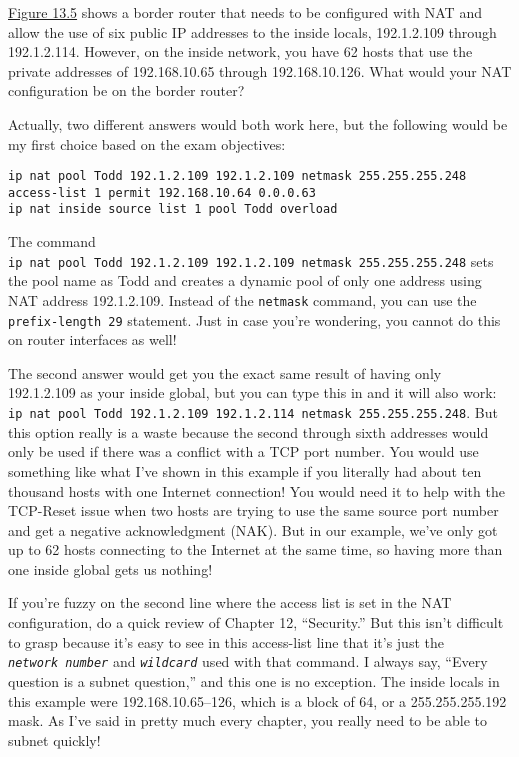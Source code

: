 \protect\hyperlink{c13.xhtmlux5cux23figure13-5}{Figure
13.5} shows a border router that needs to be configured with NAT and
allow the use of six public IP addresses to the inside locals,
192.1.2.109 through 192.1.2.114. However, on the inside network, you
have 62 hosts that use the private addresses of 192.168.10.65 through
192.168.10.126. What would your NAT configuration be on the border
router?

Actually, two different answers would both work here, but the following
would be my first choice based on the exam objectives:

\begin{verbatim}
ip nat pool Todd 192.1.2.109 192.1.2.109 netmask 255.255.255.248
access-list 1 permit 192.168.10.64 0.0.0.63
ip nat inside source list 1 pool Todd overload
\end{verbatim}

The command
\texttt{ip\ nat\ pool\ Todd\ 192.1.2.109\ 192.1.2.109\ netmask\ 255.255.255.248}
sets the pool name as Todd and creates a dynamic pool of only one
address using NAT address 192.1.2.109. Instead of the \texttt{netmask}
command, you can use the \texttt{prefix-length\ 29} statement. Just in
case you're wondering, you cannot do this on router interfaces as well!

The second answer would get you the exact same result of having only
192.1.2.109 as your inside global, but you can type this in and it will
also work:
\texttt{ip\ nat\ pool\ Todd\ 192.1.2.109\ 192.1.2.114\ netmask\ 255.255.255.248}.
But this option really is a waste because the second through sixth
addresses would only be used if there was a conflict with a TCP port
number. You would use something like what I've shown in this example if
you literally had about ten thousand hosts with one Internet connection!
You would need it to help with the TCP-Reset issue when two hosts are
trying to use the same source port number and get a negative
acknowledgment (NAK). But in our example, we've only got up to 62 hosts
connecting to the Internet at the same time, so having more than one
inside global gets us nothing!

If you're fuzzy on the second line where the access list is set in the
NAT configuration, do a quick review of Chapter 12, ``Security.'' But
this isn't difficult to grasp because it's easy to see in this
access-list line that it's just the \emph{\texttt{network\ number}} and
\emph{\texttt{wildcard}} used with that command. I always say, ``Every
question is a subnet question,'' and this one is no exception. The
inside locals in this example were 192.168.10.65--126, which is a block
of 64, or a 255.255.255.192 mask. As I've said in pretty much every
chapter, you really need to be able to subnet quickly!

